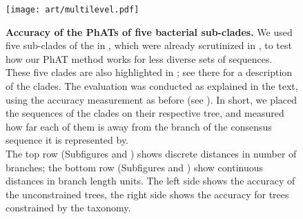 \begin{figure}[hpbt]
    \centering
    \texttt{[image: art/multilevel.pdf]}
    \begin{subfigure}{0pt}
        \label{fig:multilevel:sub:edge_unconstr}
    \end{subfigure}
    \begin{subfigure}{0pt}
        \label{fig:multilevel:sub:edge_constr}
    \end{subfigure}
    \begin{subfigure}{0pt}
        \label{fig:multilevel:sub:branch_unconstr}
    \end{subfigure}
    \begin{subfigure}{0pt}
        \label{fig:multilevel:sub:branch_constr}
    \end{subfigure}
    \caption[Accuracy of the \acsp{PhAT} of five bacterial sub-clades]{
        \textbf{Accuracy of the \acsp{PhAT} of five bacterial sub-clades.}
        We used five sub-clades of the  in ,
        which were already scrutinized in \citep{Kozlov2016},
        to test how our \ac{PhAT} method works for less diverse sets of sequences.
        These five clades are also highlighted in ;
        see there for a description of the clades.
        The evaluation was conducted as explained in the text,
        using the accuracy measurement as before (see ).
        In short, we placed the  sequences of the clades on their respective tree,
        and measured how far each of them is away from the branch of the consensus sequence it is represented by.
        \\
        The top row (Subfigures  and )
        shows discrete distances in number of branches;
        the bottom row (Subfigures  and )
        show continuous distances in branch length units.
        The left side shows the accuracy of the unconstrained trees,
        the right side shows the accuracy for trees constrained by the  taxonomy.
    }
    \label{fig:multilevel}
\end{figure}

